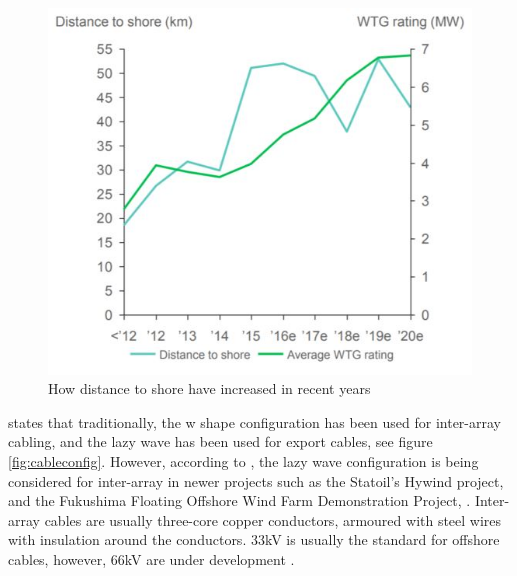 \begin{figure}[H]
\centering
\includegraphics[scale=0.9]{figures/distshore}
\caption[$\; \:$Distance to shore ]{How distance to shore have increased in recent years \cite{Make2016}}
 \label{fig:distshore}
\end{figure}

\noindent \cite{srinil2016} states that traditionally, the w shape configuration has been used for inter-array cabling, and the lazy wave has been used for export cables, see figure \ref{fig:cableconfig}. However, according to \cite{ds2010}, the lazy wave configuration is being considered for inter-array in newer projects such as the Statoil's Hywind project, and the Fukushima Floating Offshore Wind
Farm Demonstration Project, \cite{yagihashi2015dynamic}. Inter-array cables are usually three-core copper conductors, armoured with steel wires with insulation around the conductors. 33kV is usually the standard for offshore cables, however, 66kV are under development \cite{srinil2016}. 


